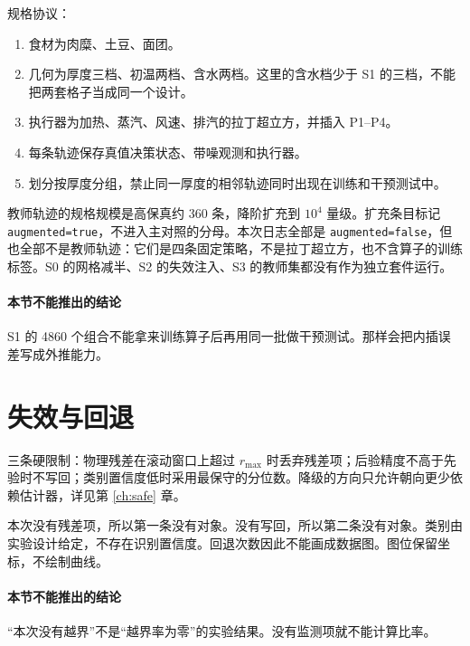 规格协议：

\begin{enumerate}
\item 食材为肉糜、土豆、面团。
\item 几何为厚度三档、初温两档、含水两档。这里的含水档少于 S1 的三档，不能把两套格子当成同一个设计。
\item 执行器为加热、蒸汽、风速、排汽的拉丁超立方，并插入 P1--P4。
\item 每条轨迹保存真值决策状态、带噪观测和执行器。
\item 划分按厚度分组，禁止同一厚度的相邻轨迹同时出现在训练和干预测试中。
\end{enumerate}

教师轨迹的规格规模是高保真约 360 条，降阶扩充到 \(10^4\) 量级。扩充条目标记 \texttt{augmented=true}，不进入主对照的分母。本次日志全部是 \texttt{augmented=false}，但也全部不是教师轨迹：它们是四条固定策略，不是拉丁超立方，也不含算子的训练标签。S0 的网格减半、S2 的失效注入、S3 的教师集都没有作为独立套件运行。

\paragraph{本节不能推出的结论}
S1 的 4860 个组合不能拿来训练算子后再用同一批做干预测试。那样会把内插误差写成外推能力。

\section{失效与回退}

三条硬限制：物理残差在滚动窗口上超过 \(r_{\max}\) 时丢弃残差项；后验精度不高于先验时不写回；类别置信度低时采用最保守的分位数。降级的方向只允许朝向更少依赖估计器，详见第 \ref{ch:safe} 章。

本次没有残差项，所以第一条没有对象。没有写回，所以第二条没有对象。类别由实验设计给定，不存在识别置信度。回退次数因此不能画成数据图。图位保留坐标，不绘制曲线。

\paragraph{本节不能推出的结论}
“本次没有越界”不是“越界率为零”的实验结果。没有监测项就不能计算比率。
